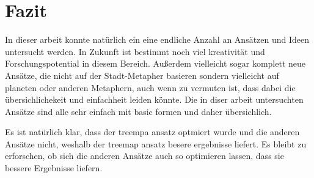 \section{Fazit} \label{sec:Fazit}
In dieser arbeit konnte natürlich ein eine endliche Anzahl an Ansätzen und Ideen untersucht werden. In Zukunft ist bestimmt noch viel kreativität und Forschungspotential in diesem Bereich. Außerdem vielleicht sogar komplett neue Ansätze, die nicht auf der Stadt-Metapher basieren sondern vielleicht auf planeten oder anderen Metaphern, auch wenn zu vermuten ist, dass dabei die übersichlichekeit und einfachheit leiden könnte. Die in diser arbeit untersuchten Ansätze sind alle sehr einfach mit basic formen und daher übersichlich.


Es ist natürlich klar, dass der treempa ansatz optmiert wurde und die anderen Ansätze nicht, weshalb der treemap ansatz besere ergebnisse liefert. 
Es bleibt zu erforschen, ob sich die anderen Ansätze auch so optimieren lassen, dass sie bessere Ergebnisse liefern.